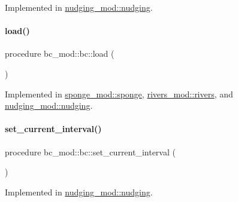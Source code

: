 Implemented in \mbox{\hyperlink{structnudging__mod_1_1nudging_ad1d7271784597d454bc97108232613cd}{nudging\+\_\+mod\+::nudging}}.

\mbox{\label{structbc__mod_1_1bc_a1c4ee986270f18f4400c4554c06c5f7b}} 
\paragraph{\texorpdfstring{load()}{load()}}
{\footnotesize\ttfamily procedure bc\+\_\+mod\+::bc\+::load (\begin{DoxyParamCaption}{ }\end{DoxyParamCaption})\hspace{0.3cm}{\ttfamily [private]}}



Implemented in \mbox{\hyperlink{structsponge__mod_1_1sponge_a0383aabeecf15b7c47bc43c9b4746c60}{sponge\+\_\+mod\+::sponge}}, \mbox{\hyperlink{structrivers__mod_1_1rivers_a4eac45372772ea12c7f18505a4de53ee}{rivers\+\_\+mod\+::rivers}}, and \mbox{\hyperlink{structnudging__mod_1_1nudging_ad0fe3f6011636572c0641ef4b01bba33}{nudging\+\_\+mod\+::nudging}}.

\mbox{\label{structbc__mod_1_1bc_adf9262a425534bd18d98809381034ca1}} 
\paragraph{\texorpdfstring{set\+\_\+current\+\_\+interval()}{set\_current\_interval()}}
{\footnotesize\ttfamily procedure bc\+\_\+mod\+::bc\+::set\+\_\+current\+\_\+interval (\begin{DoxyParamCaption}{ }\end{DoxyParamCaption})\hspace{0.3cm}{\ttfamily [private]}}



Implemented in \mbox{\hyperlink{structnudging__mod_1_1nudging_ab17fe87aa8dc77bd4bf0cba14d68969a}{nudging\+\_\+mod\+::nudging}}.

\mbox{\label{structbc__mod_1_1bc_a925ae5960dbfc854eab908c52c13f719}} 

